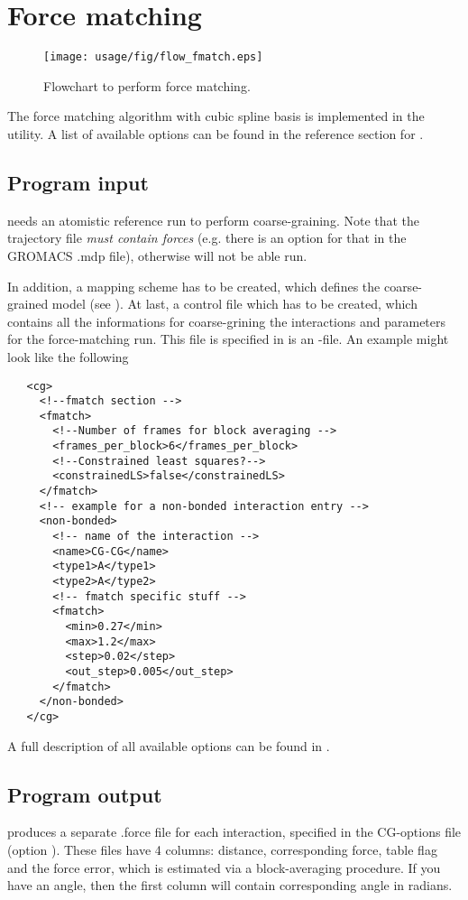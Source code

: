 \section{Force matching}
\begin{figure}
   \centering
   \texttt{[image: usage/fig/flow\_fmatch.eps]}
   \caption{Flowchart to perform force matching.}
\end{figure}
The force matching algorithm with cubic spline basis is implemented in the  utility. A list of available options can be found in the reference section for .

\subsection{Program input}
 needs an atomistic reference run to perform coarse-graining. Note that the trajectory file {\em must contain forces } (e.g. there is an option for that in the GROMACS .mdp file), otherwise  will not be able run. 

In addition, a mapping scheme has to be created, which defines the coarse-grained model (see ). At last, a control file which has to be created, which contains all the informations for coarse-grining the interactions and parameters for the force-matching run. This file is specified in  is an \xml-file. An example might look like the following
\begin{lstlisting}
   <cg>
     <!--fmatch section -->
     <fmatch>
       <!--Number of frames for block averaging -->
       <frames_per_block>6</frames_per_block>
       <!--Constrained least squares?-->
       <constrainedLS>false</constrainedLS>
     </fmatch>
     <!-- example for a non-bonded interaction entry -->
     <non-bonded>
       <!-- name of the interaction -->
       <name>CG-CG</name>
       <type1>A</type1>
       <type2>A</type2>
       <!-- fmatch specific stuff -->
       <fmatch>
         <min>0.27</min>
         <max>1.2</max>
         <step>0.02</step>
         <out_step>0.005</out_step>
       </fmatch>
     </non-bonded>
   </cg>
\end{lstlisting}
A full description of all available options can be found in .

\subsection{Program output}
 produces a separate .force file for each interaction, specified in the CG-options file (option  ).
These files have 4 columns: distance, corresponding force, table flag and the force error, which is estimated via a block-averaging procedure.
If you have an angle, then the first column will contain corresponding angle in radians.

